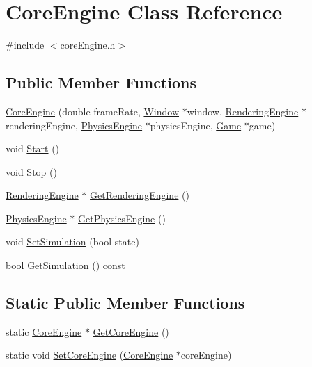 \hypertarget{class_core_engine}{}\section{Core\+Engine Class Reference}
\label{class_core_engine}


{\ttfamily \#include $<$core\+Engine.\+h$>$}

\subsection*{Public Member Functions}
\begin{DoxyCompactItemize}
\item 
\hyperlink{class_core_engine_ad828ebdde32d2b749c2e6d5c6ea9460a}{Core\+Engine} (double frame\+Rate, \hyperlink{class_window}{Window} $\ast$window, \hyperlink{class_rendering_engine}{Rendering\+Engine} $\ast$rendering\+Engine, \hyperlink{class_physics_engine}{Physics\+Engine} $\ast$physics\+Engine, \hyperlink{class_game}{Game} $\ast$game)
\item 
void \hyperlink{class_core_engine_a846ab7b6441f17ceef54ceb7045e891b}{Start} ()
\item 
void \hyperlink{class_core_engine_a18b890c2dafcb841c8b45d0e324ab068}{Stop} ()
\item 
\hyperlink{class_rendering_engine}{Rendering\+Engine} $\ast$ \hyperlink{class_core_engine_a347a39ec08bde097dd93d50fc850e7a1}{Get\+Rendering\+Engine} ()
\item 
\hyperlink{class_physics_engine}{Physics\+Engine} $\ast$ \hyperlink{class_core_engine_acb446732d06178f55eda89ef32bab7b5}{Get\+Physics\+Engine} ()
\item 
void \hyperlink{class_core_engine_a49789f1b66c018e944e9e3929a896738}{Set\+Simulation} (bool state)
\item 
bool \hyperlink{class_core_engine_a9facc85782ab5112ba80aada6d2a1214}{Get\+Simulation} () const 
\end{DoxyCompactItemize}
\subsection*{Static Public Member Functions}
\begin{DoxyCompactItemize}
\item 
static \hyperlink{class_core_engine}{Core\+Engine} $\ast$ \hyperlink{class_core_engine_a66fa2bc850f4922acd44769ade1d42dd}{Get\+Core\+Engine} ()
\item 
static void \hyperlink{class_core_engine_a990a9435f091ec88762677f7830225ba}{Set\+Core\+Engine} (\hyperlink{class_core_engine}{Core\+Engine} $\ast$core\+Engine)
\end{DoxyCompactItemize}


